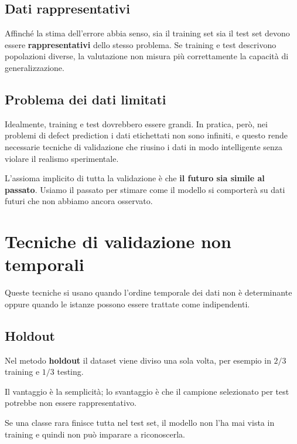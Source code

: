 \subsection{Dati rappresentativi}

Affinché la stima dell'errore abbia senso, sia il training set sia il test set devono essere \textbf{rappresentativi} dello stesso problema. Se training e test descrivono popolazioni diverse, la valutazione non misura più correttamente la capacità di generalizzazione.

\subsection{Problema dei dati limitati}

Idealmente, training e test dovrebbero essere grandi. In pratica, però, nei problemi di defect prediction i dati etichettati non sono infiniti, e questo rende necessarie tecniche di validazione che riusino i dati in modo intelligente senza violare il realismo sperimentale.

\begin{notaprof}
L'assioma implicito di tutta la validazione è che \textbf{il futuro sia simile al passato}. Usiamo il passato per stimare come il modello si comporterà su dati futuri che non abbiamo ancora osservato.
\end{notaprof}

\section{Tecniche di validazione non temporali}

Queste tecniche si usano quando l'ordine temporale dei dati non è determinante oppure quando le istanze possono essere trattate come indipendenti.

\subsection{Holdout}

Nel metodo \textbf{holdout} il dataset viene diviso una sola volta, per esempio in \(2/3\) training e \(1/3\) testing.

Il vantaggio è la semplicità; lo svantaggio è che il campione selezionato per test potrebbe non essere rappresentativo.

\begin{notaprof}
Se una classe rara finisce tutta nel test set, il modello non l'ha mai vista in training e quindi non può imparare a riconoscerla.
\end{notaprof}

